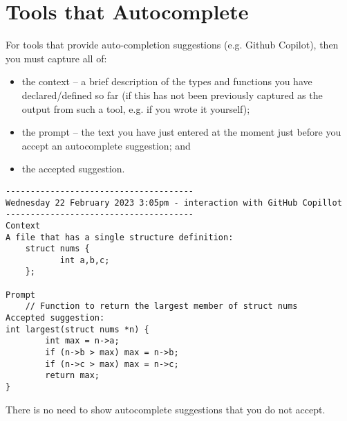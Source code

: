 \documentclass{article}
\begin{document}
\section{Tools that Autocomplete}

For tools that provide auto-completion suggestions (e.g. Github Copilot), then you must capture all of:
\begin{itemize}
\item the context -- a brief description of the types and functions you have declared/defined so far (if this has not been
previously captured as the output from such a tool, e.g. if you wrote it yourself);
\item the prompt -- the text you have just entered at the moment just before you accept an autocomplete suggestion; and
\item the accepted suggestion.
\end{itemize}

\nolinenumbers
{}
\begin{lstlisting}
--------------------------------------
Wednesday 22 February 2023 3:05pm - interaction with GitHub Copillot
--------------------------------------
Context
A file that has a single structure definition:
	struct nums {
     	   int a,b,c;
	};

Prompt
	// Function to return the largest member of struct nums
Accepted suggestion:
int largest(struct nums *n) {
        int max = n->a;
        if (n->b > max) max = n->b;
        if (n->c > max) max = n->c;
        return max;
}
\end{lstlisting}
\linenumbers

There is no need to show autocomplete suggestions that you do not accept. 
\end{document}
